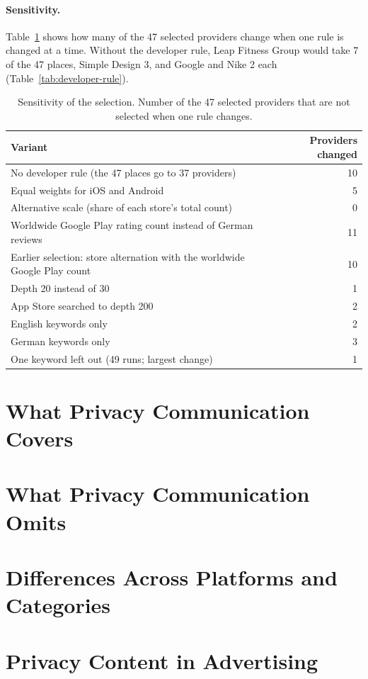 \paragraph{Sensitivity.} Table~\ref{tab:sensitivity} shows how many of the 47
selected providers change when one rule is changed at a time. Without the
developer rule, Leap Fitness Group would take 7 of the 47 places, Simple Design
3, and Google and Nike 2 each (Table~\ref{tab:developer-rule}).

\begin{table}[t]
\centering
\begin{singlespace}
\caption[Sensitivity of the selection]{Sensitivity of the selection. Number of the 47 selected providers that
are not selected when one rule changes.}
\label{tab:sensitivity}
\small
\begin{tabularx}{\textwidth}{@{}Xr@{}}
\toprule
\textbf{Variant} & \textbf{Providers changed} \\
\midrule
No developer rule (the 47 places go to 37 providers) & 10 \\
Equal weights for iOS and Android & 5 \\
Alternative scale (share of each store's total count) & 0 \\
Worldwide Google Play rating count instead of German reviews & 11 \\
Earlier selection: store alternation with the worldwide Google Play count & 10 \\
Depth 20 instead of 30 & 1 \\
App Store searched to depth 200 & 2 \\
English keywords only & 2 \\
German keywords only & 3 \\
One keyword left out (49 runs; largest change) & 1 \\
\bottomrule
\end{tabularx}
\end{singlespace}
\end{table}

\section{What Privacy Communication Covers}

\section{What Privacy Communication Omits}

\section{Differences Across Platforms and Categories}

\section{Privacy Content in Advertising}

